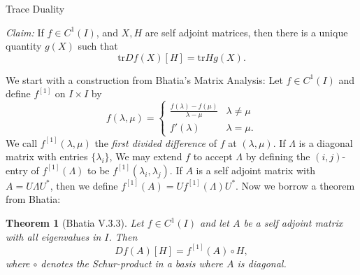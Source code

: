 \documentclass[12pt]{exam}
\newtheorem{theorem}{Theorem}
\begin{document}
\begin{center}
  {\Large Trace Duality}
\end{center}

\emph{Claim:} If $f \in C ^{1} (I)$, and $X,H$ are self adjoint matrices, then
there is a unique quantity $g(X)$ such that
\[
  \text{tr} Df(X)[H] = \text{tr} Hg(X).
\]

\bigskip

We start with a construction from Bhatia's Matrix Analysis: Let
$f \in C ^{1} (I)$ and define $f ^{[1]} $ on $I \times I$ by
\[
  f (\lambda,\mu) =
  \begin{cases}
    \frac{f(\lambda) - f(\mu)}{\lambda-\mu} & \lambda \neq \mu \\
    f'(\lambda) & \lambda = \mu.
  \end{cases}
\]
We call $f ^{[1]} (\lambda,\mu)$ the \emph{first divided difference} of $f$ at
$(\lambda,\mu)$. If $\Lambda$ is a diagonal matrix with entries
$\{ \lambda_{i}\} $, We may extend $f$ to accept $\Lambda$ by
defining the $(i,j)$-entry of $f ^{[1]} (\Lambda)$ to be
$f ^{[1]} (\lambda_i,\lambda_j)$. If $A$ is a self adjoint matrix with
$A = U \Lambda U ^{*} $, then we define
$f ^{[1]} (A) = U f ^{[1]} (\Lambda) U ^{*} $. Now we borrow a theorem from Bhatia:
\begin{theorem}[Bhatia V.3.3]
  Let $f \in C ^{1} (I)$ and let $A$ be a self adjoint matrix with all
  eigenvalues in $I$. Then \[
    Df(A)[H] = f ^{[1]} (A) \circ H,
  \]
  where $\circ$ denotes the Schur-product in a basis where $A$ is diagonal.
\end{theorem}
\end{document}

